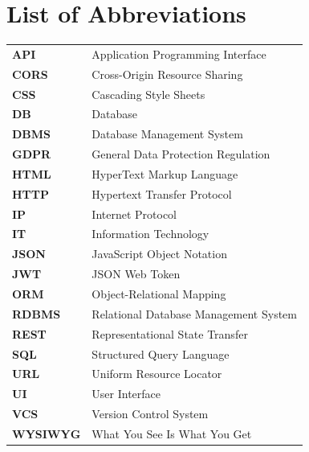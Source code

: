 \chapter*{List of Abbreviations}

\begin{longtable}{ll}
    \textbf{API} & Application Programming Interface \\
    \textbf{CORS} & Cross-Origin Resource Sharing \\
    \textbf{CSS} & Cascading Style Sheets \\
    \textbf{DB} & Database \\
    \textbf{DBMS} & Database Management System \\
    \textbf{GDPR} & General Data Protection Regulation \\
    \textbf{HTML} & HyperText Markup Language \\
    \textbf{HTTP} & Hypertext Transfer Protocol \\
    \textbf{IP} & Internet Protocol \\
    \textbf{IT} & Information Technology \\
    \textbf{JSON} & JavaScript Object Notation \\
    \textbf{JWT} & JSON Web Token \\
    \textbf{ORM} & Object-Relational Mapping \\
    \textbf{RDBMS} & Relational Database Management System \\
    \textbf{REST} & Representational State Transfer \\
    \textbf{SQL} & Structured Query Language \\
    \textbf{URL} & Uniform Resource Locator \\
    \textbf{UI} & User Interface \\
    \textbf{VCS} & Version Control System \\
    \textbf{WYSIWYG} & What You See Is What You Get \\
\end{longtable}
